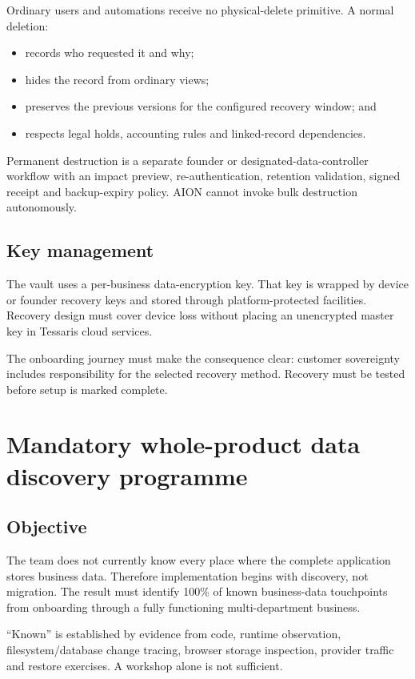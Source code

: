 \documentclass[11pt]{article}
\begin{document}
Ordinary users and automations receive no physical-delete primitive. A normal deletion:

\begin{itemize}
  \item records who requested it and why;
  \item hides the record from ordinary views;
  \item preserves the previous versions for the configured recovery window; and
  \item respects legal holds, accounting rules and linked-record dependencies.
\end{itemize}

Permanent destruction is a separate founder or designated-data-controller workflow with an impact preview, re-authentication, retention validation, signed receipt and backup-expiry policy. AION cannot invoke bulk destruction autonomously.

\subsection{Key management}

The vault uses a per-business data-encryption key. That key is wrapped by device or founder recovery keys and stored through platform-protected facilities. Recovery design must cover device loss without placing an unencrypted master key in Tessaris cloud services.

The onboarding journey must make the consequence clear: customer sovereignty includes responsibility for the selected recovery method. Recovery must be tested before setup is marked complete.

\section{Mandatory whole-product data discovery programme}

\subsection{Objective}

The team does not currently know every place where the complete application stores business data. Therefore implementation begins with discovery, not migration. The result must identify 100\% of known business-data touchpoints from onboarding through a fully functioning multi-department business.

``Known'' is established by evidence from code, runtime observation, filesystem/database change tracing, browser storage inspection, provider traffic and restore exercises. A workshop alone is not sufficient.
\end{document}
